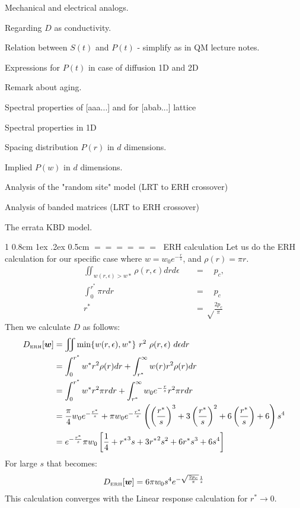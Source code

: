 \documentclass[onecolumn,fleqn,notitlepage,secnumarabic]{revtex4}
\makeatletter
\newcommand{\tbox}[1]{\mbox{\tiny #1}}
\newcommand{\beq}{\begin{eqnarray}}
\newcommand{\eeq}{\end{eqnarray}}
\def\section{%
  \@startsection
    {section}%
    {1}%
    {\z@}%
    {0.8cm \@plus1ex \@minus .2ex}%
    {0.5cm}%
    {\Large\bf $=\!=\!=\!=\!=\!=\;$}%
}%
\makeatother
\begin{document}
Mechanical and electrical analogs.

Regarding $D$ as conductivity.

Relation between $S(t)$ and $P(t)$ - simplify as in QM lecture notes.

Expressions for $P(t)$ in case of diffusion 1D and 2D

Remark about aging.

Spectral properties of [aaa...] and for [abab...] lattice

Spectral properties in 1D

Spacing distribution $P(r)$ in $d$ dimensions.

Implied $P(w)$ in $d$ dimensions. 

Analysis of the "random site" model (LRT to ERH crossover) 

Analysis of banded matrices (LRT to ERH crossover)

The errata KBD model. 



\clearpage

\section{ERH calculation}
Let us do the ERH calculation for our specific case where $w =w_0 e^{-\frac{r}{s}}$, and $\rho(r) = \pi r$.
%
\begin{align}
\iint_{w(r,\epsilon)>w*} \rho(r,\epsilon)drd\epsilon \quad &= \quad p_c, \\
\int_0^{r^*} \pi r dr \quad &=\quad p_c \\
r^*  &= \sqrt\frac{ 2 p_c}{\pi}
\end{align}
%
Then we calculate $D$ as follows:
%
\begin{align}
  D_{\tbox{ERH}}[\bm{w}] &= \iint \min\{w(r,\epsilon),w^*\} \ r^2  \ \rho(r,\epsilon) \ d\epsilon dr \\
  &= \int_0^{r^*} w^* r^2\rho(r) dr  + \int_{r^*}^\infty w(r) r^2\rho(r)dr \\
  &= \int_0^{r^*} w^* r^2 \pi rdr  + \int_{r^*}^\infty w_0e^{-\frac{r}{s}} r^2 \pi rdr \\
  &=  \frac{\pi}{4}w_0 e^{-\frac{r^*}{s}} + \pi w_0  e^{-\frac{r^*}{s}}\left( \left(\frac{r^*}{s}\right)^3 + 3\left(\frac{r^*}{s}\right)^2 + 6\left(\frac{r^*}{s}\right) +6 \right) s^4 \\
  &=  e^{-\frac{r^*}{s}}\pi w_0\left[\frac{1}{4} +  {r^*}^3 s + 3{r^*}^2 s^2 + 6r^*s^3 +6 s^4  \right]
\end{align}
%
For large $s$ that becomes:
\beq
  D_{\tbox{ERH}}[\bm{w}] = 6\pi w_0 s^4 e^{-\sqrt\frac{2p_c}{\pi}\frac{1}{s}}
\eeq
This calculation converges with the Linear response calculation for $r^* \rightarrow 0$.
\end{document}
